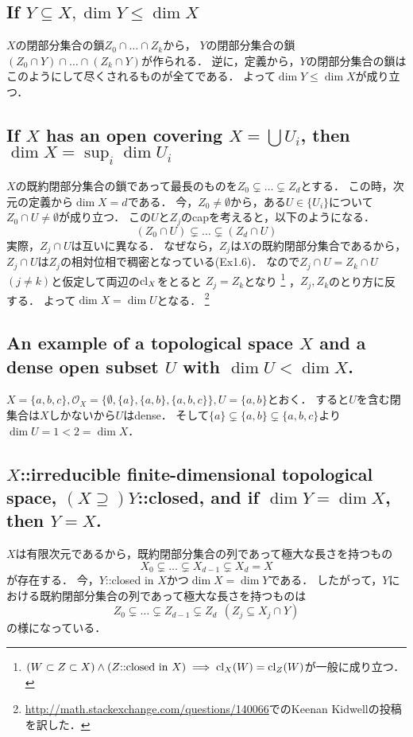 \documentclass[a4paper]{jsarticle}
\begin{document}
    \subsection{If $Y \subseteq X, \dim Y \leq \dim X$}
    $X$の閉部分集合の鎖$Z_0 \cap \dots \cap Z_k$から，
    $Y$の閉部分集合の鎖$(Z_0 \cap Y) \cap \dots \cap (Z_k \cap Y)$が作られる．
    逆に，定義から，$Y$の閉部分集合の鎖はこのようにして尽くされるものが全てである．
    よって$\dim Y \leq \dim X$が成り立つ．

    \subsection{If $X$ has an open covering $X=\bigcup U_i$, then $\dim X=\sup_{i} \dim U_i$}
    $X$の既約閉部分集合の鎖であって最長のものを$Z_0 \subsetneq \dots \subsetneq Z_d$とする．
    この時，次元の定義から$\dim X=d$である．
    今，$Z_0 \neq \emptyset$から，ある$U \in \{U_i\}$について$Z_0 \cap U \neq \emptyset$が成り立つ．
    この$U$と$Z_j$のcapを考えると，以下のようになる．
    \[ (Z_0 \cap U) \subsetneq \dots \subsetneq (Z_d \cap U) \]
    実際，$Z_j \cap U$は互いに異なる．
    なぜなら，$Z_j$は$X$の既約閉部分集合であるから，$Z_j \cap U$は$Z_j$の相対位相で稠密となっている(Ex1.6)．
    なので$Z_j \cap U=Z_k \cap U$$(j \neq k)$と仮定して両辺の$\operatorname{cl}_{X}$をとると
    $Z_j=Z_k$となり
    \footnote{$(W \subset Z \subset X) \land (Z\mbox{::closed in }X) \implies \operatorname{cl}_{X}(W)=\operatorname{cl}_{Z}(W)$が一般に成り立つ．}
    ，$Z_j, Z_k$のとり方に反する．
    よって$\dim X=\dim U$となる．
    \footnote{\url{http://math.stackexchange.com/questions/140066}でのKeenan Kidwellの投稿を訳した．}

    \subsection{An example of a topological space $X$ and a dense open subset $U$ with $\dim U <\dim X$.}
    $X=\{a,b,c\}, \mathcal{O}_X=\{ \emptyset, \{a\}, \{a,b\}, \{a,b,c\} \}, U=\{a,b\}$とおく．
    すると$U$を含む閉集合は$X$しかないから$U$はdense．
    そして$\{a\} \subsetneq \{a,b\} \subsetneq \{a,b,c\}$より$\dim U=1<2=\dim X$．

    \subsection{$X$::irreducible finite-dimensional topological space, $(X \supseteq) Y$::closed, and if $\dim Y = \dim X$, then $Y = X$.}
    $X$は有限次元であるから，既約閉部分集合の列であって極大な長さを持つもの
    \[ X_0 \subsetneq \dots \subsetneq X_{d-1} \subsetneq X_d=X \]が存在する．
    今，$Y$::closed in $X$かつ$\dim X=\dim Y$である．
    したがって，$Y$における既約閉部分集合の列であって極大な長さを持つものは
    \[ Z_0 \subsetneq \dots \subsetneq Z_{d-1} \subsetneq Z_d ~~ (Z_j \subseteq X_j \cap Y) \]
    の様になっている．
\end{document}
